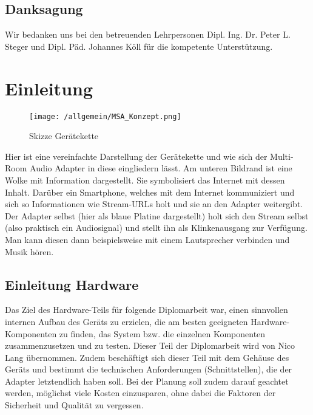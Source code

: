 \documentclass[11pt, twoside]{article}
\begin{document}
\subsection{Danksagung}
Wir bedanken uns bei den betreuenden Lehrpersonen Dipl. Ing. Dr. Peter L. Steger und Dipl. Päd. Johannes Köll für die kompetente Unterstützung.

\pagebreak
\tableofcontents
\pagebreak

\pagestyle{fancy} %
\setcounter{page}{1} %

\section{Einleitung}
\begin{figure}[H]
\begin{center}
\texttt{[image: /allgemein/MSA\_Konzept.png]}
\caption{Skizze Gerätekette}
\end{center}
\end{figure}
Hier ist eine vereinfachte Darstellung der Gerätekette und wie sich der Multi-Room Audio Adapter in diese eingliedern lässt.\newline
Am unteren Bildrand ist eine Wolke mit Information dargestellt. Sie symbolisiert das Internet mit dessen Inhalt. Darüber ein Smartphone, welches mit dem Internet kommuniziert und sich so Informationen wie Stream-URLs holt und sie an den Adapter weitergibt. Der Adapter selbst (hier als blaue Platine dargestellt) holt sich den Stream selbst (also praktisch ein Audiosignal) und stellt ihn als Klinkenausgang zur Verfügung. Man kann diesen dann beispielsweise mit einem Lautsprecher verbinden und Musik hören.

\subsection{Einleitung Hardware}
Das Ziel des Hardware-Teils für folgende Diplomarbeit war, einen sinnvollen internen Aufbau des Geräts zu erzielen, die am besten geeigneten Hardware-Komponenten zu finden, das System bzw. die einzelnen Komponenten zusammenzusetzen und zu testen. Dieser Teil der Diplomarbeit wird von Nico Lang übernommen.
Zudem beschäftigt sich dieser Teil mit dem Gehäuse des Geräts und bestimmt die technischen Anforderungen (Schnittstellen), die der Adapter letztendlich haben soll. 
Bei der Planung soll zudem darauf geachtet werden, möglichst viele Kosten einzusparen, ohne dabei die Faktoren der Sicherheit und Qualität zu vergessen.
\end{document}
